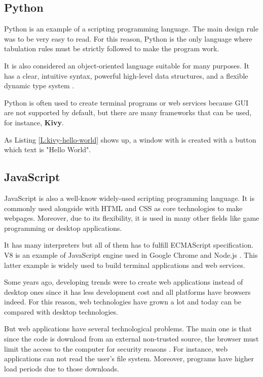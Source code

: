 \subsection{Python}

Python is an example of a scripting programming language. The main design rule
was to be very easy to read. For this reason, Python is the only language where
tabulation rules must be strictly followed to make the program work.

It is also considered an object-oriented language suitable for many purposes.
It has a clear, intuitive syntax, powerful high-level data structures, and a
flexible dynamic type system \cite{An93pythonfor}.

Python is often used to create terminal programs or web services because GUI
are not supported by default, but there are many frameworks that can be used,
for instance, \textbf{Kivy}.

\begin{codefigure}
\end{codefigure}

As Listing \ref{L:kivy-hello-world} shows up, a window with is created with a
button which text is "Hello World".

\subsection{JavaScript}

JavaScript is also a well-know widely-used scripting programming language. It is commonly used
alongside with HTML and CSS as core technologies to make webpages. Moreover, due
to its flexibility, it is used in many other fields like game programming or
desktop applications.

It has many interpreters but all of them has to fulfill ECMAScript
specification. V8 is an example of JavaScript engine used in Google Chrome and
Node.js \cite{nodejs-web}. This latter example is widely used to build terminal
applications and web services.

Some years ago, developing trends were to create web applications instead of
desktop ones since it has less development cost and all platforms have browsers
indeed. For this reason, web technologies have grown a lot and today can be
compared with desktop technologies.

But web applications have several technological problems. The main one is that
since the code is download from an external non-trusted source, the browser
must limit the access to the computer for security reasons
\cite{securing-your-browser}. For instance, web applications can not read the
user's file system. Moreover, programs have higher load periods due to those
downloads.

